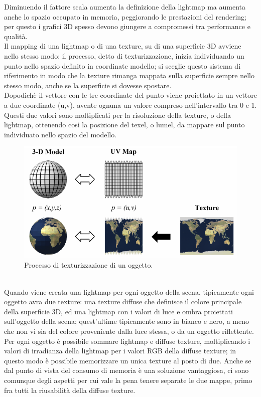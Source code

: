 Diminuendo il fattore scala aumenta la definizione della lightmap ma aumenta anche lo spazio occupato in memoria, peggiorando le prestazioni del rendering; per questo i grafici 3D spesso devono giungere a compromessi tra performance e qualità. 
\\
Il mapping di una lightmap o di una texture, su di una superficie 3D avviene nello stesso modo: il processo, detto di texturizzazione, inizia individuando un punto nello spazio definito in coordinate modello; si sceglie questo sistema di riferimento in modo che la texture rimanga mappata sulla superficie sempre nello stesso modo, anche se la superficie si dovesse spostare. \\
Dopodichè il vettore con le tre coordinate del punto viene proiettato in un vettore a due coordinate (u,v), avente ognuna un valore compreso nell’intervallo tra 0 e 1. Questi due valori sono moltiplicati per la risoluzione della texture, o della lightmap, ottenendo così la posizione del texel, o lumel, da mappare sul punto individuato nello spazio del modello.
\\
\begin{figure}[htb]
 \centering
 \includegraphics[width=0.8\linewidth]{images/chapter_stato_arte/stato_arte_uvmap.png}\hfill
 \caption[Texturizzazione mediante mappa UV]{Processo di texturizzazione di un oggetto.}
 \label{fig:stato_arte_uvmap}
\end{figure}
\\
Quando viene creata una lightmap per ogni oggetto della scena, tipicamente ogni oggetto avra due texture: una texture diffuse che definisce il colore principale della superficie 3D, ed una lightmap con i valori di luce e ombra proiettati sull’oggetto della scena; quest’ultime tipicamente sono in bianco e nero, a meno che non vi sia del colore proveniente dalla luce stessa, o da un oggetto riflettente. 
\\
Per ogni oggetto è possibile sommare lightmap e diffuse texture, moltiplicando i valori di irradianza della lightmap per i valori RGB della diffuse texture; in questo modo è possibile memorizzare un unica texture al posto di due. Anche se dal punto di vista del consumo di memoria è una soluzione vantaggiosa, ci sono comunque degli aspetti per cui vale la pena tenere separate le due mappe, primo fra tutti la riusabilità della diffuse texture.
